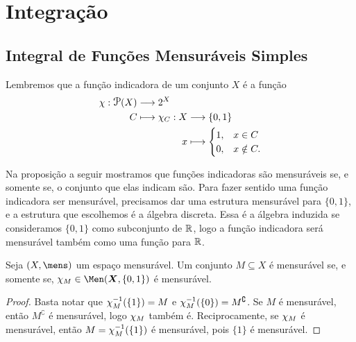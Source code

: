 \chapter{Integração}

\section{Integral de Funções Mensuráveis Simples}

Lembremos que a função indicadora de um conjunto $X$ é a função
	\begin{align*}
	\func{\idc}{\p(X)}{2^X}{C}{
		\begin{aligned}[t]
		\func{\idc_C}{X}{\{0,1\}}{x}{
			\begin{cases}
			1,& x \in C \\
			0,& x \notin C.
			\end{cases}
		}
		\end{aligned}
	}
	\end{align*}

Na proposição a seguir mostramos que funções indicadoras são mensuráveis se, e somente se, o conjunto que elas indicam são. Para fazer sentido uma função indicadora ser mensurável, precisamos dar uma estrutura mensurável para $\{0,1\}$, e a estrutura que escolhemos é a álgebra discreta. Essa é a álgebra induzida se consideramos $\{0,1\}$ como subconjunto de $\mathbb{R}$, logo a função indicadora será mensurável também como uma função para $\mathbb{R}$.

\begin{prop}
Seja $(X,\mens)$ um espaço mensurável. Um conjunto $M \subseteq X$ é mensurável se, e somente se, $\idc_M \in \Men(\bm X,\{0,1\})$ é mensurável.
\end{prop}
\begin{proof}
Basta notar que $\chi_M^{-1}(\{1\}) = M$ e $\chi_M^{-1}(\{0\}) = M^\complement$. Se $M$ é mensurável, então $M^\complement$ é mensurável, logo $\chi_M$ também é. Reciprocamente, se $\chi_M$ é mensurável, então $M = \chi_M^{-1}(\{1\})$ é mensurável, pois $\{1\}$ é mensurável.
\end{proof}



